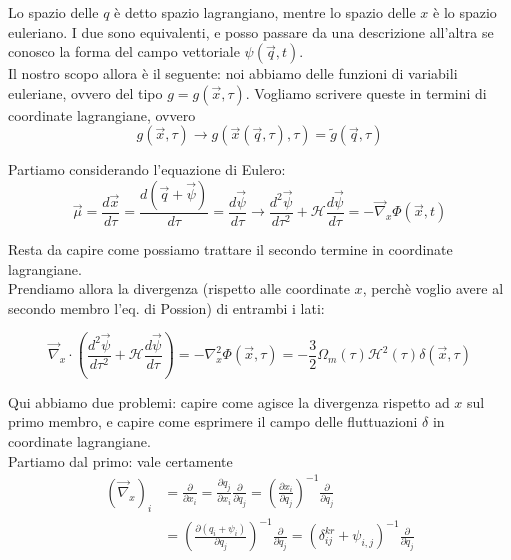 \documentclass{report}
\begin{document}
Lo spazio delle $q$ è detto spazio lagrangiano, mentre lo spazio delle $x$ è lo spazio euleriano. I due sono equivalenti, e posso passare da una descrizione all'altra se conosco la forma del campo vettoriale $\psi(\vec{q}, t)$.  \\

Il nostro scopo allora è il seguente: noi abbiamo delle funzioni di variabili euleriane, ovvero del tipo $g = g(\vec{x}, \tau)$. Vogliamo scrivere queste in termini di coordinate lagrangiane, ovvero 
\begin{equation}
    g(\vec{x}, \tau) \rightarrow g(\vec{x}(\vec{q}, \tau), \tau) = \tilde{g}(\vec{q}, \tau)
\end{equation}

Partiamo considerando l'equazione di Eulero: 
\begin{equation}
    \vec{\mu} = \frac{d\vec{x}}{d\tau} = \frac{d(\vec{q} + \vec{\psi})}{d\tau} = \frac{d\vec{\psi}}{d\tau} \rightarrow \frac{d^2\vec{\psi}}{d\tau^2} + \mathcal{H}\frac{d\vec{\psi}}{d\tau} = -\vec{\nabla}_x\Phi(\vec{x}, t)
\end{equation}

Resta da capire come possiamo trattare il secondo termine in coordinate lagrangiane. \\ Prendiamo allora la divergenza (rispetto alle coordinate $x$, perchè voglio avere al secondo membro l'eq. di Possion) di entrambi i lati: 

\begin{equation}
    \vec{\nabla}_x \cdot \left(\frac{d^2\vec{\psi}}{d\tau^2} + \mathcal{H}\frac{d\vec{\psi}}{d\tau}\right) = -\nabla^2_x \Phi(\vec{x}, \tau) = -\frac{3}{2}\Omega_m(\tau)\mathcal{H}^2(\tau)\delta(\vec{x}, \tau)
\end{equation}

Qui abbiamo due problemi: capire come agisce la divergenza rispetto ad $x$ sul primo membro, e capire come esprimere il campo delle fluttuazioni $\delta$ in coordinate lagrangiane. \\

Partiamo dal primo: vale certamente 
\begin{align}
    (\vec{\nabla}_x)_i &= \frac{\partial}{\partial x_i} = \frac{\partial q_j}{\partial x_i} \frac{\partial}{\partial q_j} = \left(\frac{\partial x_i}{\partial q_j} \right)^{-1}\frac{\partial }{\partial q_j} \\ &= \left(\frac{\partial (q_i + \psi_i)}{\partial q_j} \right)^{-1}\frac{\partial }{\partial q_j} = \left(\delta^{kr}_{ij} + \psi_{i,j}\right)^{-1}\frac{\partial }{\partial q_j}
\end{align}
\end{document}
